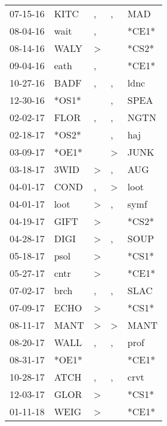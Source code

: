 \begin{supertabular}{lllll}
 07-15-16 &   KITC &                , &                , &    MAD \\
 08-04-16 &   wait &                , &                  &  *CE1* \\
 08-14-16 &   WALY &     \textgreater &                  &  *CS2* \\
 09-04-16 &   eath &                , &                  &  *CE1* \\
 10-27-16 &   BADF &                , &                , &   ldnc \\
 12-30-16 &  *OS1* &                  &                , &   SPEA \\
 02-02-17 &   FLOR &                , &                , &   NGTN \\
 02-18-17 &  *OS2* &                  &                , &    haj \\
 03-09-17 &  *OE1* &                  &     \textgreater &   JUNK \\
 03-18-17 &   3WID &     \textgreater &                , &    AUG \\
 04-01-17 &   COND &                , &     \textgreater &   loot \\
 04-01-17 &   loot &     \textgreater &                , &   symf \\
 04-19-17 &   GIFT &     \textgreater &                  &  *CS2* \\
 04-28-17 &   DIGI &     \textgreater &                , &   SOUP \\
 05-18-17 &   psol &     \textgreater &                  &  *CS1* \\
 05-27-17 &   cntr &     \textgreater &                  &  *CE1* \\
 07-02-17 &   brch &                , &                , &   SLAC \\
 07-09-17 &   ECHO &     \textgreater &                  &  *CS1* \\
 08-11-17 &   MANT &     \textgreater &     \textgreater &   MANT \\
 08-20-17 &   WALL &                , &                , &   prof \\
 08-31-17 &  *OE1* &                  &                  &  *CE1* \\
 10-28-17 &   ATCH &                , &                , &   crvt \\
 12-03-17 &   GLOR &     \textgreater &                  &  *CS1* \\
 01-11-18 &   WEIG &     \textgreater &                  &  *CE1* \\

\end{supertabular}

